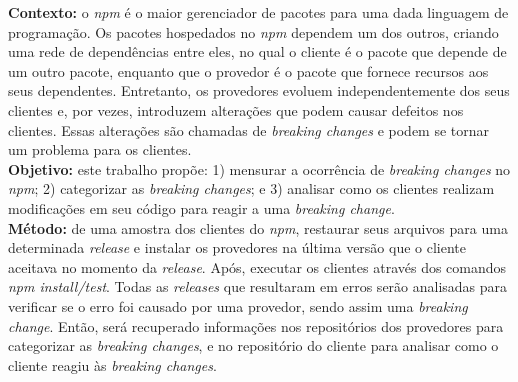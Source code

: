 \begin{resumo}

\textbf{Contexto:} o \textit{npm} é o maior gerenciador de pacotes para uma dada linguagem de programação. Os pacotes hospedados no \textit{npm} dependem um dos outros, criando uma rede de dependências entre eles, no qual o cliente é o pacote que depende de um outro pacote, enquanto que o provedor é o pacote que fornece recursos aos seus dependentes. Entretanto, os provedores evoluem independentemente dos seus clientes e, por vezes, introduzem alterações que podem causar defeitos nos clientes. Essas alterações são chamadas de \textit{breaking changes} e podem se tornar um problema para os clientes.\\
\textbf{Objetivo:} este trabalho propõe: 1) mensurar a ocorrência de \textit{breaking changes} no \textit{npm}; 2) categorizar as \textit{breaking changes}; e 3) analisar como os clientes realizam modificações em seu código para reagir a uma \textit{breaking change}.\\
\textbf{Método:} de uma amostra dos clientes do \textit{npm}, restaurar seus arquivos para uma determinada \textit{release} e instalar os provedores na última versão que o cliente aceitava no momento da \textit{release}. Após, executar os clientes através dos comandos \textit{npm install/test}. Todas as \textit{releases} que resultaram em erros serão analisadas para verificar se o erro foi causado por uma provedor, sendo assim uma \textit{breaking change}. Então, será recuperado informações nos repositórios dos provedores para categorizar as \textit{breaking changes}, e no repositório do cliente para analisar como o cliente reagiu às \textit{breaking changes}.\\

\end{resumo}